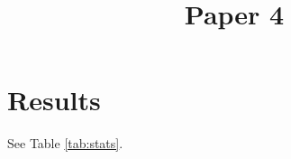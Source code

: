 \documentclass{ieeeaccess}
\begin{document}
\title{Paper 4}
\section{Results}
See Table \ref{tab:stats}.
\end{document}
